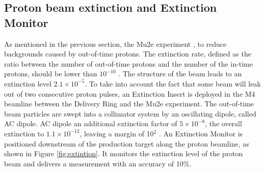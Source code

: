 \subsection{Proton beam extinction and Extinction Monitor}
As mentioned in the previous section, the Mu2e experiment 
,
to reduce backgrounds caused by out-of-time protons. 
The extinction rate, defined as the ratio between the 
number of out-of-time protons and the number of the in-time protons, should be lower than $10^{-10}$ \cite{bartoszek2015mu2e}. The structure of the beam 
leads to an extinction level $2.1 \times 10^{-5}$. To take into account the fact that some beam will 
leak out of two consecutive proton pulses, an Extinction 
Insert is deployed in the M4 beamline between the Delivery Ring and the Mu2e experiment.
The out-of-time beam particles are swept into a collimator system by an oscillating dipole, called AC dipole.
 AC dipole  an additional 
extinction factor of $5\times 10^{-8}$,  the 
overall extinction to $1.1 \times 10^{-12}$, leaving a margin of 10$^2$ \cite{accelerator}. An 
Extinction Monitor is positioned downstream of the 
production target along the proton beamline, as shown in Figure \ref{fig:extintion}. It monitors the 
extinction level of the proton beam and delivers a measurement with an accuracy of 10\%.

